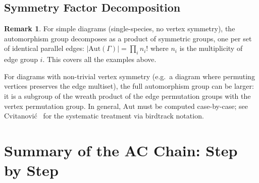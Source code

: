 \documentclass[11pt,a4paper]{article}
\theoremstyle{definition}
\newtheorem*{remark}{Remark}
\newcommand{\Aut}{\mathrm{Aut}}
\begin{document}
\subsection{Symmetry Factor Decomposition}

\begin{remark}
For simple diagrams (single-species, no vertex symmetry), the
automorphism group decomposes as a product of symmetric groups,
one per set of identical parallel edges:
$|\Aut(\Gamma)| = \prod_i n_i!$ where $n_i$ is the multiplicity of
edge group $i$. This covers all the examples above.

For diagrams with non-trivial vertex symmetry (e.g.\ a diagram where
permuting vertices preserves the edge multiset), the full automorphism
group can be larger: it is a subgroup of the wreath product of the edge
permutation groups with the vertex permutation group. In general, $\Aut$
must be computed case-by-case; see Cvitanovi\'{c}~\cite{cvitanovic2008}
for the systematic treatment via birdtrack notation.
\end{remark}

\section{Summary of the AC Chain: Step by Step}
\label{sec:summary}
\end{document}
